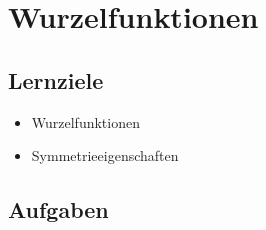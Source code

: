 \section{Wurzelfunktionen}

\subsection*{Lernziele}

\begin{itemize}
\item Wurzelfunktionen
\item Symmetrieeigenschaften
\end{itemize}

\subsection*{Aufgaben}


\newpage
